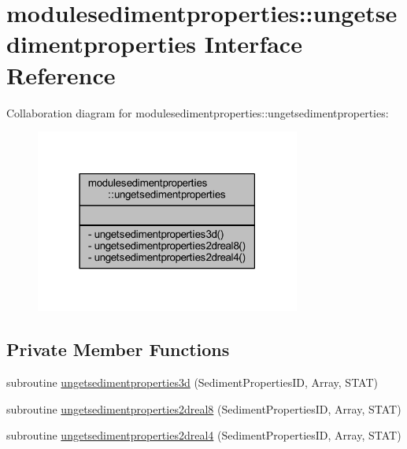 \hypertarget{interfacemodulesedimentproperties_1_1ungetsedimentproperties}{}\section{modulesedimentproperties\+:\+:ungetsedimentproperties Interface Reference}
\label{interfacemodulesedimentproperties_1_1ungetsedimentproperties}


Collaboration diagram for modulesedimentproperties\+:\+:ungetsedimentproperties\+:\nopagebreak
\begin{figure}[H]
\begin{center}
\leavevmode
\includegraphics[width=247pt]{interfacemodulesedimentproperties_1_1ungetsedimentproperties__coll__graph}
\end{center}
\end{figure}
\subsection*{Private Member Functions}
\begin{DoxyCompactItemize}
\item 
subroutine \mbox{\hyperlink{interfacemodulesedimentproperties_1_1ungetsedimentproperties_ac3fc98142b99ecebcd9eb57b589eb00d}{ungetsedimentproperties3d}} (Sediment\+Properties\+ID, Array, S\+T\+AT)
\item 
subroutine \mbox{\hyperlink{interfacemodulesedimentproperties_1_1ungetsedimentproperties_a8ccac60d1c8d8e6810ca2058293b10b0}{ungetsedimentproperties2dreal8}} (Sediment\+Properties\+ID, Array, S\+T\+AT)
\item 
subroutine \mbox{\hyperlink{interfacemodulesedimentproperties_1_1ungetsedimentproperties_a572e343122705a3412d5a2c79041bf4b}{ungetsedimentproperties2dreal4}} (Sediment\+Properties\+ID, Array, S\+T\+AT)
\end{DoxyCompactItemize}


